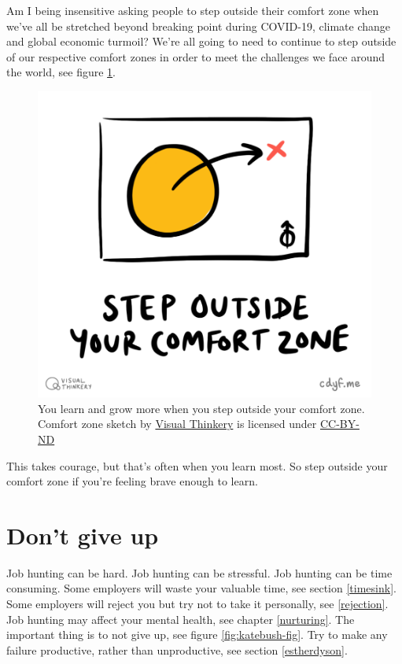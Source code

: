 \documentclass[
]{book}
\begin{document}
Am I being insensitive asking people to step outside their comfort zone when we've all be stretched beyond breaking point during COVID-19, climate change and global economic turmoil? We're all going to need to continue to step outside of our respective comfort zones in order to meet the challenges we face around the world, see figure \ref{fig:comfortzone-fig}.

\begin{figure}

{\centering \includegraphics[width=0.75\linewidth]{images/Step outside your comfort zone} 

}

\caption{You learn and grow more when you step outside your comfort zone. Comfort zone sketch by \href{https://visualthinkery.com}{Visual Thinkery} is licensed under \href{https://creativecommons.org/licenses/by-nd/4.0/}{CC-BY-ND}}\label{fig:comfortzone-fig}
\end{figure}



This takes courage, but that's often when you learn most. So step outside your comfort zone if you're feeling brave enough to learn.

\hypertarget{nevergiveup}{%
\section{Don't give up}\label{nevergiveup}}

Job hunting can be hard. Job hunting can be stressful. Job hunting can be time consuming. Some employers will waste your valuable time, see section \ref{timesink}. Some employers will reject you but try not to take it personally, see \ref{rejection}. Job hunting may affect your mental health, see chapter \ref{nurturing}. The important thing is to not give up, see figure \ref{fig:katebush-fig}. Try to make any failure productive, rather than unproductive, see section \ref{estherdyson}.
\end{document}
